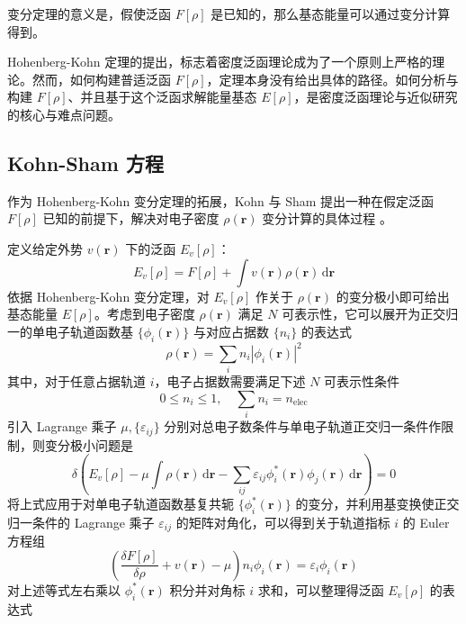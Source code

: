 变分定理的意义是，假使泛函 $F[\rho]$ 是已知的，那么基态能量可以通过变分计算得到。

Hohenberg-Kohn 定理的提出，标志着密度泛函理论成为了一个原则上严格的理论。然而，如何构建普适泛函 $F[\rho]$，定理本身没有给出具体的路径。如何分析与构建 $F[\rho]$、并且基于这个泛函求解能量基态 $E[\rho]$，是密度泛函理论与近似研究的核心与难点问题。

\subsection{Kohn-Sham 方程}

作为 Hohenberg-Kohn 变分定理的拓展，Kohn 与 Sham 提出一种在假定泛函 $F[\rho]$ 已知的前提下，解决对电子密度 $\rho(\bm{r})$ 变分计算的具体过程 \cite{Kohn-Sham.PR.1965}。

定义给定外势 $v (\bm{r})$ 下的泛函 $E_{v}[\rho]$：
\begin{equation}
  E_{v}[\rho] = F[\rho] + \int v (\bm{r}) \rho (\bm{r}) \, \mathrm{d} \bm{r}
\end{equation}
依据 Hohenberg-Kohn 变分定理，对 $E_{v}[\rho]$ 作关于 $\rho(\bm{r})$ 的变分极小即可给出基态能量 $E[\rho]$。考虑到电子密度 $\rho(\bm{r})$ 满足 $N$ 可表示性，它可以展开为正交归一的单电子轨道函数基 $\{\phi_i(\bm{r})\}$ 与对应占据数 $\{n_i\}$ 的表达式
\begin{equation}
  \rho(\bm{r}) = \sum_i n_i |\phi_i(\bm{r})|^2
\end{equation}
其中，对于任意占据轨道 $i$，电子占据数需要满足下述 $N$ 可表示性条件
\begin{equation}
  0 \leqslant n_i \leqslant 1, \quad \sum_i n_i = n_\mathrm{elec}
\end{equation}
引入 Lagrange 乘子 $\mu, \{ \varepsilon_{ij} \}$ 分别对总电子数条件与单电子轨道正交归一条件作限制，则变分极小问题是
\begin{equation}
  \delta \left( E_{v}[\rho] - \mu \int \rho(\bm{r}) \, \mathrm{d} \bm{r} - \sum_{ij} \varepsilon_{ij} \phi_i^*(\bm{r}) \phi_j(\bm{r})  \, \mathrm{d} \bm{r} \right) = 0
\end{equation}
将上式应用于对单电子轨道函数基复共轭 $\{\phi_i^*(\bm{r})\}$ 的变分，并利用基变换使正交归一条件的 Lagrange 乘子 $\varepsilon_{ij}$ 的矩阵对角化，可以得到关于轨道指标 $i$ 的 Euler 方程组
\begin{equation}
  \label{eq.1.frac-ks}
  \left( \frac{\delta F[\rho]}{\delta \rho} + v(\bm{r}) - \mu \right) n_i \phi_i (\bm{r}) = \varepsilon_i \phi_i (\bm{r})
\end{equation}
对上述等式左右乘以 $\phi_i^* (\bm{r})$ 积分并对角标 $i$ 求和，可以整理得泛函 $E_{v}[\rho]$ 的表达式
